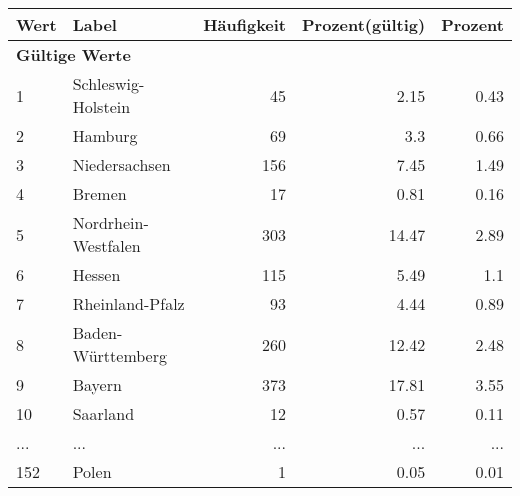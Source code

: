      \begin{longtable}{lXrrr}
     \toprule
     \textbf{Wert} & \textbf{Label} & \textbf{Häufigkeit} & \textbf{Prozent(gültig)} & \textbf{Prozent} \\
     \endhead
     \midrule
     \multicolumn{5}{l}{\textbf{Gültige Werte}}\\
        1 & \multicolumn{1}{X}{Schleswig-Holstein} & %
          \num{45} &
          \num[round-mode=places,round-precision=2]{2,15} &
          \num[round-mode=places,round-precision=2]{0,43} \\
        2 & \multicolumn{1}{X}{Hamburg} & %
          \num{69} &
          \num[round-mode=places,round-precision=2]{3,3} &
          \num[round-mode=places,round-precision=2]{0,66} \\
        3 & \multicolumn{1}{X}{Niedersachsen} & %
          \num{156} &
          \num[round-mode=places,round-precision=2]{7,45} &
          \num[round-mode=places,round-precision=2]{1,49} \\
        4 & \multicolumn{1}{X}{Bremen} & %
          \num{17} &
          \num[round-mode=places,round-precision=2]{0,81} &
          \num[round-mode=places,round-precision=2]{0,16} \\
        5 & \multicolumn{1}{X}{Nordrhein-Westfalen} & %
          \num{303} &
          \num[round-mode=places,round-precision=2]{14,47} &
          \num[round-mode=places,round-precision=2]{2,89} \\
        6 & \multicolumn{1}{X}{Hessen} & %
          \num{115} &
          \num[round-mode=places,round-precision=2]{5,49} &
          \num[round-mode=places,round-precision=2]{1,1} \\
        7 & \multicolumn{1}{X}{Rheinland-Pfalz} & %
          \num{93} &
          \num[round-mode=places,round-precision=2]{4,44} &
          \num[round-mode=places,round-precision=2]{0,89} \\
        8 & \multicolumn{1}{X}{Baden-Württemberg} & %
          \num{260} &
          \num[round-mode=places,round-precision=2]{12,42} &
          \num[round-mode=places,round-precision=2]{2,48} \\
        9 & \multicolumn{1}{X}{Bayern} & %
          \num{373} &
          \num[round-mode=places,round-precision=2]{17,81} &
          \num[round-mode=places,round-precision=2]{3,55} \\
        10 & \multicolumn{1}{X}{Saarland} & %
          \num{12} &
          \num[round-mode=places,round-precision=2]{0,57} &
          \num[round-mode=places,round-precision=2]{0,11} \\
       ... & ... & ... & ... & ... \\
        152 & \multicolumn{1}{X}{Polen} & %
          \num{1} &
          \num[round-mode=places,round-precision=2]{0,05} &
          \num[round-mode=places,round-precision=2]{0,01} \\


\end{longtable}
